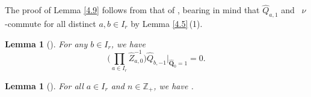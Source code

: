 \documentclass[pdftex]{sigma}
\numberwithin{equation}{section}
\newtheorem{Lemma}[Theorem]{Lemma}
\begin{document}
The proof of Lemma \ref{4.9} follows from that of \cite[Lemma 5.9]{DFK14}, bearing in mind that $\widehat{Q}_{a,1}$ and~ $\nu$-commute for all distinct $a,b\in I_r$ by Lemma \ref{4.5}\,(1).

\begin{Lemma}[{\cite[Lemma 5.12]{DFK14}}]\label{4.10}
For any $b\in I_r$, we have
\begin{equation*}
\biggl(\prod_{a\in I_r}\widehat{Z}_{a,0}^{-1}\biggr)\widehat{Q}_{b,-1}\biggl|_{\widehat{\mathbf{Q}}_0=1}=0.
\end{equation*}
\end{Lemma}

\begin{Lemma}[{\cite[Lemma 5.14]{DFK14}}]\label{4.11}
For all $a\in I_r$ and $n\in\mathbb{Z}_+$, we have .
\end{Lemma}
\end{document}
